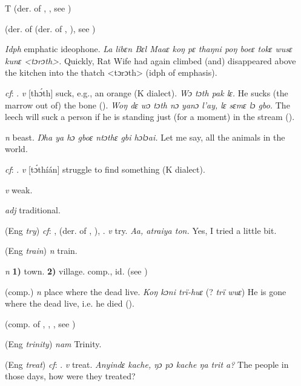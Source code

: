 \begin{letter}{T}
 (der. of , , see )

 (der. of  (der. of , ), see ) 

 \textit{Idph} emphatic ideophone. \textit{La libɛn Bɛl Maaɛ koŋ pɛ thaŋni poŋ boeɛ tokɛ wusɛ kunɛ <tɔrɔth>.} Quickly, Rat Wife had again climbed (and) disappeared above the kitchen into the thatch <tɔrɔth> (idph of emphasis). 

 \textit{cf}: . \textit{v} [thɔ́th] suck, e.g., an orange (K dialect). \textit{Wɔ tɔth pak lɛ.} He sucks (the marrow out of) the bone (\citealt{Pichl1967}).\textit{ Woŋ dɛ wɔ tɔth nɔ yanɔ l'ay, lɛ sɛmɛ lɔ gbo.} The leech will suck a person if he is standing just (for a moment) in the stream (\citealt{Pichl1967}). 

 \textit{n} beast. \textit{Ŋha ya hɔ gboɛ ntɔthɛ gbi hɔlɔai.} Let me say, all the animals in the world.

 \textit{cf}: . \textit{v} [tɔ́thíán] struggle to find something (K dialect).

 \textit{v} weak.

 \textit{adj} traditional.

 (Eng \textit{try}) \textit{cf}: ,  (der. of , ), . \textit{v} try. \textit{Aa, atraiya ton.} Yes, I tried a little bit.

 (Eng \textit{train}) \textit{n} train.

 \textit{n} \textbf{1)} town. \textbf{2)} village. comp., id.  (see )

 (comp.) \textit{n} place where the dead live. \textit{Koŋ kɔni trï-huɛ} (? \textit{trï wuɛ}) He is gone where the dead live, i.e. he died (\citealt{Pichl1967}). 

 (comp. of , , , see ) 

 (Eng \textit{trinity}) \textit{nam} Trinity.

 (Eng \textit{treat}) \textit{cf}: . \textit{v} treat. \textit{Anyindɛ kache, ŋɔ pɔ kache ŋa trit a?} The people in those days, how were they treated?


\end{letter}
